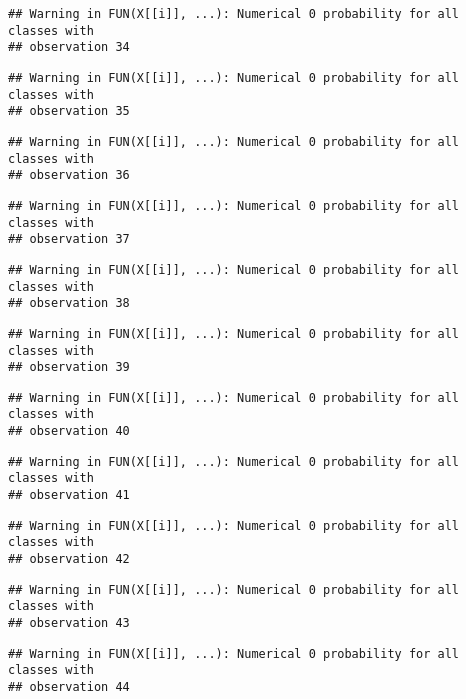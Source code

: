 \documentclass[
]{article}
\begin{document}
\begin{verbatim}
## Warning in FUN(X[[i]], ...): Numerical 0 probability for all classes with
## observation 34
\end{verbatim}

\begin{verbatim}
## Warning in FUN(X[[i]], ...): Numerical 0 probability for all classes with
## observation 35
\end{verbatim}

\begin{verbatim}
## Warning in FUN(X[[i]], ...): Numerical 0 probability for all classes with
## observation 36
\end{verbatim}

\begin{verbatim}
## Warning in FUN(X[[i]], ...): Numerical 0 probability for all classes with
## observation 37
\end{verbatim}

\begin{verbatim}
## Warning in FUN(X[[i]], ...): Numerical 0 probability for all classes with
## observation 38
\end{verbatim}

\begin{verbatim}
## Warning in FUN(X[[i]], ...): Numerical 0 probability for all classes with
## observation 39
\end{verbatim}

\begin{verbatim}
## Warning in FUN(X[[i]], ...): Numerical 0 probability for all classes with
## observation 40
\end{verbatim}

\begin{verbatim}
## Warning in FUN(X[[i]], ...): Numerical 0 probability for all classes with
## observation 41
\end{verbatim}

\begin{verbatim}
## Warning in FUN(X[[i]], ...): Numerical 0 probability for all classes with
## observation 42
\end{verbatim}

\begin{verbatim}
## Warning in FUN(X[[i]], ...): Numerical 0 probability for all classes with
## observation 43
\end{verbatim}

\begin{verbatim}
## Warning in FUN(X[[i]], ...): Numerical 0 probability for all classes with
## observation 44
\end{verbatim}
\end{document}
